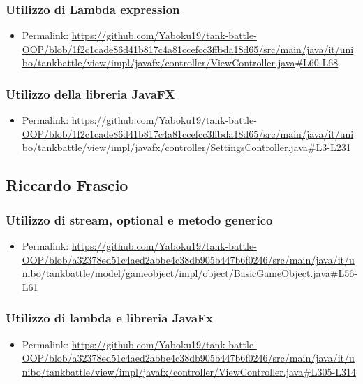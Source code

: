 \documentclass[a4paper,12pt]{report}
\begin{document}
\subsubsection*{Utilizzo di Lambda expression}
\begin{itemize}
    \item Permalink: \url{https://github.com/Yaboku19/tank-battle-OOP/blob/1f2c1cade86d41b817c4a81ccefcc3ffbda18d65/src/main/java/it/unibo/tankbattle/view/impl/javafx/controller/ViewController.java#L60-L68}
\end{itemize}
\subsubsection*{Utilizzo della libreria JavaFX}
\begin{itemize}
    \item Permalink: \url{https://github.com/Yaboku19/tank-battle-OOP/blob/1f2c1cade86d41b817c4a81ccefcc3ffbda18d65/src/main/java/it/unibo/tankbattle/view/impl/javafx/controller/SettingsController.java#L3-L231}
\end{itemize}
\newpage
\subsection*{Riccardo Frascio}
\subsubsection*{Utilizzo di stream, optional e metodo generico}
\begin{itemize}
    \item Permalink: \url{https://github.com/Yaboku19/tank-battle-OOP/blob/a32378ed51c4aed2abbe4c38db905b447b6f0246/src/main/java/it/unibo/tankbattle/model/gameobject/impl/object/BasicGameObject.java#L56-L61}
\end{itemize}
\subsubsection*{Utilizzo di lambda e libreria JavaFx}
\begin{itemize}
    \item Permalink: \url{https://github.com/Yaboku19/tank-battle-OOP/blob/a32378ed51c4aed2abbe4c38db905b447b6f0246/src/main/java/it/unibo/tankbattle/view/impl/javafx/controller/ViewController.java#L305-L314}
\end{itemize}
\end{document}
